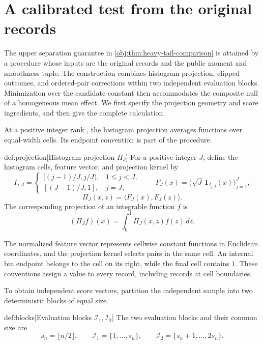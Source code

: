 \section{A calibrated test from the original records}

The upper separation guarantee in \cref{obj:thm:heavy-tail-comparison} is attained by a procedure whose inputs are the original records and the public moment and smoothness tuple. The construction combines histogram projection, clipped outcomes, and ordered-pair corrections within two independent evaluation blocks. Minimization over the candidate constant then accommodates the composite null of a homogeneous mean effect. We first specify the projection geometry and score ingredients, and then give the complete calculation.

At a positive integer rank , the histogram projection averages functions over equal-width cells. Its endpoint convention is part of the procedure.

\begin{definitionv}{def:projection}[Histogram projection \(\Pi_J\)]
For a positive integer \(J\), define the histogram cells, feature vector, and projection kernel by
\[
I_{j,J}=
\begin{cases}
[(j-1)/J,j/J),&1\le j<J,\\
[(J-1)/J,1],&j=J,
\end{cases}
\qquad
F_J(x)=\bigl(\sqrt J\,\mathbf 1_{I_{j,J}}(x)\bigr)_{j=1}^J,
\]
\[
\Pi_J(x,z)=\langle F_J(x),F_J(z)\rangle.
\]
The corresponding projection of an integrable function \(f\) is
\[
(\Pi_J f)(x)=\int_0^1\Pi_J(x,z)f(z)\,dz.
\]
\end{definitionv}

The normalized feature vector  represents cellwise constant functions in Euclidean coordinates, and the projection kernel  selects pairs in the same cell. An internal bin endpoint belongs to the cell on its right, while the final cell contains \(1\). These conventions assign a value to every record, including records at cell boundaries.

To obtain independent score vectors, partition the independent sample into two deterministic blocks of equal size.

\begin{definitionv}{def:blocks}[Evaluation blocks \(\mathcal I_1,\mathcal I_2\)]
The two evaluation blocks and their common size are
\[
s_n=\lfloor n/2\rfloor,
\qquad
\mathcal I_1=\{1,\ldots,s_n\},
\qquad
\mathcal I_2=\{s_n+1,\ldots,2s_n\}.
\]
\end{definitionv}

